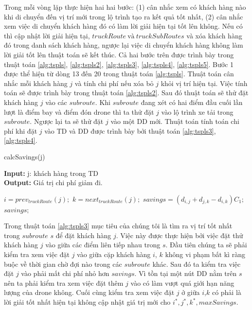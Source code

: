 \documentclass[a4paper,12pt]{report}
\begin{document}
Trong mỗi vòng lặp thực hiện hai hai bước: (1) cân nhắc xem có khách hàng nào khi di chuyển đến vị trí mới trong lộ trình tạo ra kết quả tốt nhất, (2) cân nhắc xem việc di chuyển khách hàng đó có làm lời giải hiện tại tốt lên không. Nếu có thì cập nhật lời giải hiện tại, $truckRoute \ \text{và} \ truckSubRoutes$ và xóa khách hàng đó trong danh sách khách hàng, ngược lại việc di chuyển khách hàng không làm lời giải tốt lên thuật toán sẽ kết thúc. Cả hai bước trên được trình bày trong thuật toán \ref{alg:tspls}, \ref{alg:tspls2}, \ref{alg:tspls3}, \ref{alg:tspls4}, \ref{alg:tspls5}.
Bước 1 được thể hiện từ dòng 13 đến 20 trong thuật toán \ref{alg:tspls}. Thuật toán cân nhắc mỗi khách hàng $j$ và tính chi phí nếu xóa bỏ $j$ khỏi vị trí hiện tại. Việc tính toán sẽ được trình bày trong thuật toán \ref{alg:tspls2}. Sau đó thuật toán sẽ thử đặt khách hàng $j$ vào các $subroute$. Khi $subroute$ đang xét có hai điểm đầu cuối lần lượt là điểm bay và điểm đón drone thì ta thử đặt $j$ vào lộ trình xe tải trong $subroute$. Ngược lại ta sẽ thử đặt $j$ vào một \ac{DD} mới. Thuật toán tính toán chi phí khi đặt $j$ vào \ac{TD} và \ac{DD} được trình bày bởi thuật toán \ref{alg:tspls3}, \ref{alg:tspls4}.   \\

\begin{algorithm}[H]
\caption{calcSavings(j)}
\textbf{Input:} j: khách hàng trong TD\\
\textbf{Output:} Giá trị chi phí giảm đi.
\begin{algorithmic}[1]
\State $i=prev_{truckRoute}(j);$
\State $k=next_{truckRoute}(j);$
\State $savings=(d_{i,j}+d_{j,k}-d_{i,k})C_1;$\\
\Return $savings;$
\end{algorithmic}

\label{alg:tspls2}
\end{algorithm}

Trong thuật toán \ref{alg:tspls3} mục tiêu của chúng tôi là tìm ra vị trí tốt nhất trong $subroute$ $s$ để đặt khách hàng $j$. Việc này được thực hiện bởi việc đặt thử khách hàng $j$ vào giữa các điểm liên tiếp nhau trong $s$. Đầu tiên chúng ta sẽ phải kiểm tra xem việc đặt $j$ vào giữa cặp khách hàng $i$, $k$ không vi phạm bất kì ràng buộc về thời gian chờ đợi nào trong các $subroute$ khác. Sau đó ta kiểm tra việc đặt $j$ vào phải mất chi phí nhỏ hơn $savings$. Vì tồn tại một nút \ac{DD} nằm trên $s$ nên ta phải kiểm tra xem việc đặt thêm $j$ vào có làm vượt quá giới hạn năng lượng của drone không. Cuối cùng kiểm tra xem việc đặt $j$ ở giữa $i$,$k$  có phải là lời giải tốt nhất hiện tại không cập nhật giá trị mới cho $i^*,j^*,k^*, maxSavings$.
\end{document}
